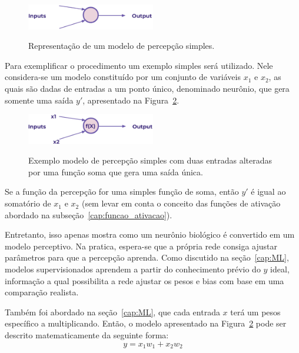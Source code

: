             \begin{figure}[H]
                \centering
                \caption{Representação de um modelo de percepção simples.}
                \includegraphics[width=0.5\textwidth]{fig/2-fundamentacao/model_perceptron/modelo_percepcao.png}
                \fonte{}
                \label{fig:modelo_percepcao}
            \end{figure}
            
            Para exemplificar o procedimento um exemplo simples será utilizado. Nele considera-se um modelo constituído por um conjunto de variáveis $x_1$ e $x_2$, as quais são dadas de entradas a um ponto único, denominado neurônio, que gera somente uma saída $y'$, apresentado na Figura~\ref{fig:entrada_neuronio_saida}. 
    
            \begin{figure}[H]
                \centering
                \caption{Exemplo modelo de percepção simples com duas entradas alteradas por uma função soma que gera uma saída única.}
                \includegraphics[width=0.5\textwidth]{fig/2-fundamentacao/model_perceptron/entrada_neuronio_saida.png}
                \fonte{}
                \label{fig:entrada_neuronio_saida}
            \end{figure}
            
            Se a função da percepção for uma simples função de soma, então $y'$ é igual ao somatório de $x_1$ e $x_2$ (sem levar em conta o conceito das funções de ativação abordado na subseção~\ref{cap:funcao_ativacao}).
            
            Entretanto, isso apenas mostra como um neurônio biológico é convertido em um modelo perceptivo. Na pratica, espera-se que a própria rede consiga ajustar parâmetros para que a percepção aprenda. Como discutido na seção~\ref{cap:ML}, modelos supervisionados aprendem a partir do conhecimento prévio do $y$ ideal, informação a qual possibilita a rede ajustar os pesos e bias com base em uma comparação realista. 
            
            Também foi abordado na seção~\ref{cap:ML}, que cada entrada $x$ terá um pesos específico a multiplicando. Então, o modelo apresentado na Figura~\ref{fig:entrada_neuronio_saida} pode ser descrito matematicamente da seguinte forma:
            \begin{equation*}
                y = x_{1}w_{1} + x_{2}w_{2}
            \end{equation*}
            
